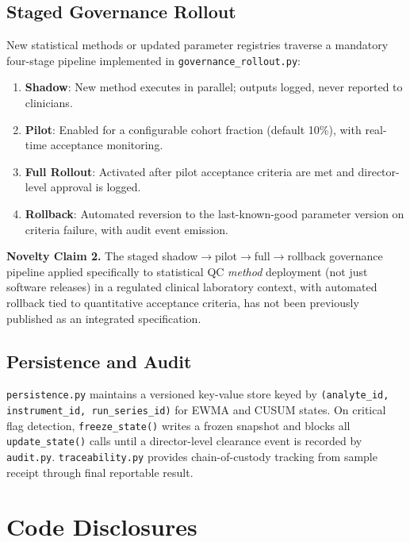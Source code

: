 \documentclass[11pt,a4paper]{article}
\begin{document}
\subsection{Staged Governance Rollout}

New statistical methods or updated parameter registries traverse a mandatory
four-stage pipeline implemented in \texttt{governance\_rollout.py}:

\begin{enumerate}
  \item \textbf{Shadow}: New method executes in parallel; outputs logged,
        never reported to clinicians.
  \item \textbf{Pilot}: Enabled for a configurable cohort fraction (default 10\%),
        with real-time acceptance monitoring.
  \item \textbf{Full Rollout}: Activated after pilot acceptance criteria are met
        and director-level approval is logged.
  \item \textbf{Rollback}: Automated reversion to the last-known-good parameter
        version on criteria failure, with audit event emission.
\end{enumerate}

\begin{noveltyenv}
\textbf{Novelty Claim 2.} The staged shadow$\to$pilot$\to$full$\to$rollback
governance pipeline applied specifically to statistical QC \emph{method}
deployment (not just software releases) in a regulated clinical laboratory
context, with automated rollback tied to quantitative acceptance criteria, has
not been previously published as an integrated specification.
\end{noveltyenv}

\subsection{Persistence and Audit}

\texttt{persistence.py} maintains a versioned key-value store keyed by
\texttt{(analyte\_id, instrument\_id, run\_series\_id)} for EWMA and CUSUM
states. On critical flag detection, \texttt{freeze\_state()} writes a frozen
snapshot and blocks all \texttt{update\_state()} calls until a director-level
clearance event is recorded by \texttt{audit.py}. \texttt{traceability.py}
provides chain-of-custody tracking from sample receipt through final reportable
result.

\section{Code Disclosures}
\label{sec:code}
\end{document}
